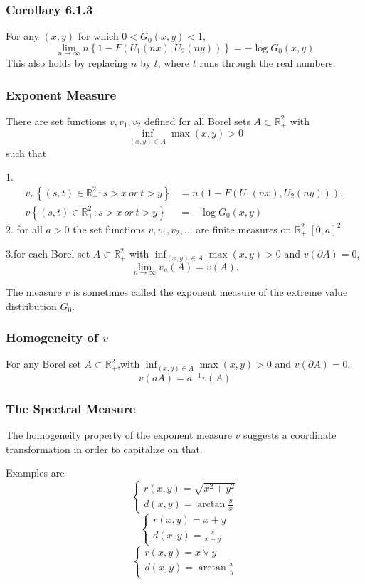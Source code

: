 \documentclass{beamer}
\newcommand{\suit}[1]{\left(#1\right)}
\newcommand{\set}[1]{\left\{#1\right\}}
\begin{document}
\begin{frame}
    \frametitle{Corollary 6.1.3}
For any $(x,y)$ for which $0<G_0(x,y)<1$,
\begin{equation}\tag{6.1.11 }
    \lim_{n\to \infty} n\set{1-F(U_1(nx),U_2(ny))}=-\log G_0(x,y)
\end{equation}
This also holds by replacing $n$ by $t$, where $t$ runs through the real numbers.

\end{frame}

\begin{frame}
    \frametitle{Exponent Measure}
There are set functions $v,v_1,v_2$ defined for all Borel sets $A\subset \mathbb{R}_{+}^2$ with 
$$
\inf_{(x,y)\in A}\max(x,y)>0 
$$
such that

1.
$$
\begin{aligned}
    v_n\set{(s,t)\in \mathbb{R}_{+}^2: s>x \ or \ t>y}&=n\suit{1-F(U_1(nx),U_2(ny))},\\
    v\set{(s,t)\in \mathbb{R}_{+}^2: s>x\  or \ t>y}&=-\log G_0(x,y)
\end{aligned}
$$
2. for all $a>0$ the set functions $v,v_1,v_2,\dots$ are finite measures on $\mathbb{R}_{+}^2 \ [0,a]^2$

3.for  each Borel set $ A\subset \mathbb{R}_{+}^2$ with $\inf_{(x,y)\in A}\max(x,y)>0$ and $v(\partial A)=0$,
$$
\lim_{n \to \infty} v_n(A)=v(A).
$$

The measure $v$ is sometimes called the exponent measure of the extreme value distribution $G_0$.
\end{frame}

\begin{frame}
    \frametitle{Homogeneity of $v$}
For any Borel set $A\subset \mathbb{R}_{+}^2$,with $\inf_{(x,y)\in A}\max(x,y)>0$ and $v(\partial A)=0$,
$$
v(aA)=a^{-1}v(A)
$$
\end{frame}


\begin{frame}
    \frametitle{The Spectral Measure}
    The homogeneity property of the exponent measure $v$ suggests a coordinate transformation in order to capitalize on that. 

Examples are
$$
\left\{
\begin{array}{l}
    r(x,y)=\sqrt{x^2+y^2}\\
    d(x,y)=\arctan \frac{y}{x}
\end{array}   
\right.
$$
$$
\left\{
\begin{array}{l}
    r(x,y)=x+y\\
    d(x,y)=\frac{x}{x+y}
\end{array}   
\right.
$$
$$
\left\{
\begin{array}{l}
    r(x,y)=x \lor y\\
    d(x,y)=\arctan \frac{x}{y}
\end{array}   
\right.
$$

\end{frame}
\end{document}
